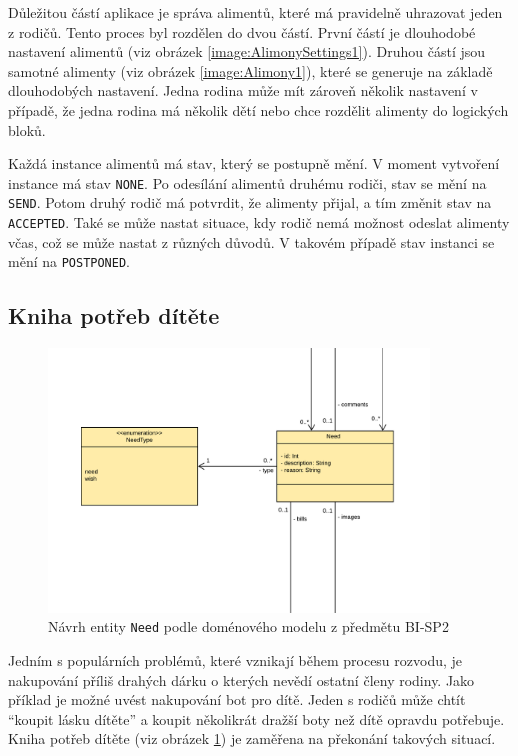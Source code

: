        Důležitou částí aplikace je správa alimentů, které má pravidelně uhrazovat jeden z rodičů. Tento proces byl rozdělen do dvou částí. První částí je dlouhodobé nastavení alimentů (viz obrázek \ref{image:AlimonySettings1}). Druhou částí jsou samotné alimenty (viz obrázek \ref{image:Alimony1}), které se generuje na základě dlouhodobých nastavení. Jedna rodina může mít zároveň několik nastavení v případě, že jedna rodina má několik dětí nebo chce rozdělit alimenty do logických bloků.
        
        Každá instance alimentů má stav, který se postupně mění. V moment vytvoření instance má stav \verb|NONE|. Po odesílání alimentů druhému rodiči, stav se mění na \verb|SEND|. Potom druhý rodič má potvrdit, že alimenty přijal, a tím změnit stav na \verb|ACCEPTED|. Také se může nastat situace, kdy rodič nemá možnost odeslat alimenty včas, což se může nastat z různých důvodů. V takovém případě stav instanci se mění na \verb|POSTPONED|.
    
    \subsection{Kniha potřeb dítěte}\label{analyza:navrh:need}
        \begin{figure}\centering
	        \includegraphics[width=0.9\textwidth]{pdfs/Need1}
	        \caption[Návrh \texttt{Need}]{Návrh entity \texttt{Need} podle doménového modelu z předmětu BI-SP2}\label{image:Need1}
        \end{figure}
        Jedním s populárních problémů, které vznikají během procesu rozvodu, je nakupování příliš drahých dárku o kterých nevědí ostatní členy rodiny. Jako příklad je možné uvést nakupování bot pro dítě. Jeden s rodičů může chtít \enquote{koupit lásku dítěte} a koupit několikrát dražší boty než dítě opravdu potřebuje. Kniha potřeb dítěte (viz obrázek \ref{image:Need1}) je zaměřena na překonání takových situací.
        
